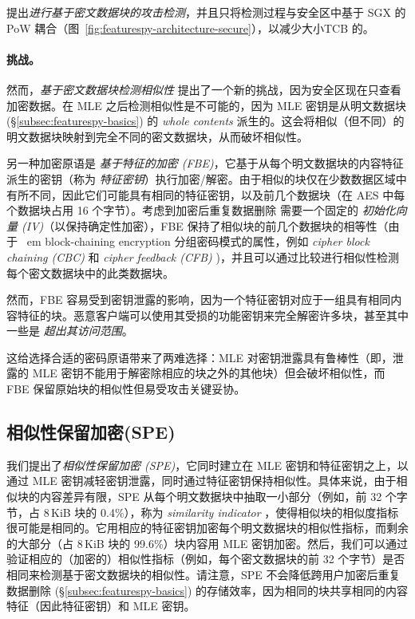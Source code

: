 \sysnameF 提出{\em 进行基于密文数据块的攻击检测}，并且只将检测过程与安全区中基于 SGX 的 PoW 耦合（图~\ref{fig:featurespy-architecture-secure}），以减少大小TCB 的。


\paragraph*{挑战。}
然而，{\em 基于密文数据块检测相似性} 提出了一个新的挑战，因为安全区现在只查看加密数据。在 MLE 之后检测相似性是不可能的，因为 MLE 密钥是从明文数据块 (\S\ref{subsec:featurespy-basics}) 的 {\em whole contents} 派生的。这会将相似（但不同）的明文数据块映射到完全不同的密文数据块，从而破坏相似性。

另一种加密原语是 {\em 基于特征的加密 (FBE)}，它基于从每个明文数据块的内容特征派生的密钥（称为 {\em 特征密钥}）执行加密/解密。由于相似的块仅在少数数据区域中有所不同，因此它们可能具有相同的特征密钥，以及前几个数据块（在 AES 中每个数据块占用 16 个字节）。考虑到加密后重复数据删除 \cite{douceur02, shah15} 需要一个固定的 {\em 初始化向量 (IV)}（以保持确定性加密），FBE 保持了相似块的前几个数据块的相等性（由于 {\ em block-chaining encryption} 分组密码模式的属性，例如 {\em cipher block chaining (CBC)} 和 {\em cipher feedback (CFB)} \cite{dworkin01})，并且可以通过比较进行相似性检测每个密文数据块中的此类数据块。


然而，FBE 容易受到密钥泄露的影响，因为一个特征密钥对应于一组具有相同内容特征的块。恶意客户端可以使用其受损的功能密钥来完全解密许多块，甚至其中一些是 {\em 超出其访问范围}。


这给选择合适的密码原语带来了两难选择：MLE 对密钥泄露具有鲁棒性（即，泄露的 MLE 密钥不能用于解密除相应的块之外的其他块）但会破坏相似性，而 FBE 保留原始块的相似性但易受攻击关键妥协。

\subsection{相似性保留加密(SPE)}
\label{subsec:featurespy-spe}

我们提出了{\em 相似性保留加密 (SPE)}，它同时建立在 MLE 密钥和特征密钥之上，以通过 MLE 密钥减轻密钥泄露，同时通过特征密钥保持相似性。具体来说，由于相似块的内容差异有限，SPE 从每个明文数据块中抽取一小部分（例如，前 32 个字节，占 8\,KiB 块的 0.4\%），称为 {\em similarity indicator} ，使得相似块的相似度指标很可能是相同的。它用相应的特征密钥加密每个明文数据块的相似性指标，而剩余的大部分（占 8\,KiB 块的 99.6\%）块内容用 MLE 密钥加密。然后，我们可以通过验证相应的（加密的）相似性指标（例如，每个密文数据块的前 32 个字节）是否相同来检测基于密文数据块的相似性。请注意，SPE 不会降低跨用户加密后重复数据删除 (\S\ref{subsec:featurespy-basics}) 的存储效率，因为相同的块共享相同的内容特征（因此特征密钥）和 MLE 密钥。

